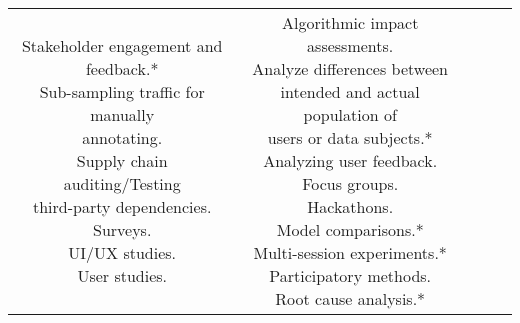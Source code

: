 \documentclass[fleqn]{article}
\begin{document}
\begin{landscape}
\begin{table}[H]
\begin{tabular}{|c|c|c|c|c|}
{			\textbullet\hspace{3pt} Stakeholder engagement and \\\hspace{10pt}feedback.* \\
			\textbullet\hspace{3pt} Sub-sampling traffic for manually \\\hspace{10pt}annotating. \\
			\textbullet\hspace{3pt} Supply chain auditing/Testing \\\hspace{10pt}third-party dependencies. \\			
			\textbullet\hspace{3pt} Surveys. \\			
			\textbullet\hspace{3pt} UI/UX studies. \\			
			\textbullet\hspace{3pt} User studies. \\
		}
		&
		\makecell[l]{ 	
			\textbullet\hspace{3pt} Algorithmic impact assessments. \\
			\textbullet\hspace{3pt} Analyze differences between \\\hspace{10pt}intended and actual population of \\\hspace{10pt}users or data subjects.*\\
			\textbullet\hspace{3pt} Analyzing user feedback. \\
			\textbullet\hspace{3pt} Focus groups. \\
			\textbullet\hspace{3pt} Hackathons. \\
			\textbullet\hspace{3pt} Model comparisons.* \\
			\textbullet\hspace{3pt} Multi-session experiments.* \\
			\textbullet\hspace{3pt} Participatory methods. \\			
			\textbullet\hspace{3pt} Root cause analysis.* \\			
}
\end{tabular}
\end{table}
\end{landscape}
\end{document}
